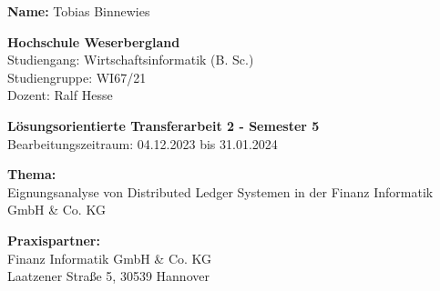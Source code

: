 
\noindent
\textbf{Name:} Tobias Binnewies

\bigbreak
\bigbreak
\bigbreak
\bigbreak
\bigbreak
\bigbreak
\bigbreak
\bigbreak


\noindent
\textbf{Hochschule Weserbergland} \\
Studiengang: Wirtschaftsinformatik (B. Sc.) \\
Studiengruppe: WI67/21 \\
Dozent: Ralf Hesse

\bigbreak
\bigbreak
\bigbreak
\bigbreak
\bigbreak
\bigbreak
\bigbreak
\bigbreak

\noindent
\textbf{Lösungsorientierte Transferarbeit 2 - Semester 5} \\
Bearbeitungszeitraum: 04.12.2023 bis 31.01.2024

\bigbreak
\bigbreak
\bigbreak
\bigbreak

\noindent
\textbf{Thema:} \\
Eignungsanalyse von Distributed Ledger Systemen in der Finanz Informatik GmbH \& Co. KG

\bigbreak
\bigbreak
\bigbreak
\bigbreak

\noindent
\textbf{Praxispartner:} \\
Finanz Informatik GmbH \& Co. KG \\
Laatzener Straße 5, 30539 Hannover

\bigbreak

\newpage

